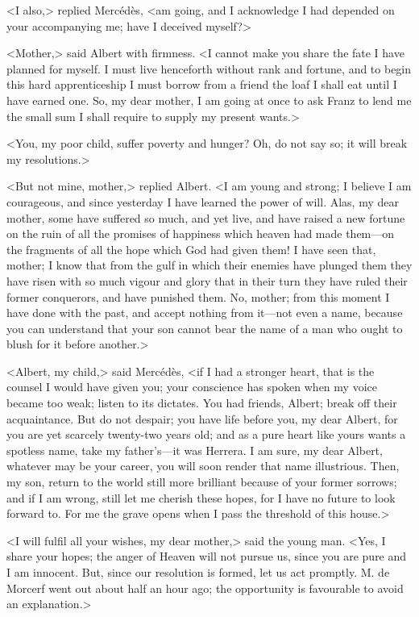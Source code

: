  <I also,> replied Mercédès, <am going, and I acknowledge I had depended on your accompanying me; have I deceived myself?> 

 <Mother,> said Albert with firmness. <I cannot make you share the fate I have planned for myself. I must live henceforth without rank and fortune, and to begin this hard apprenticeship I must borrow from a friend the loaf I shall eat until I have earned one. So, my dear mother, I am going at once to ask Franz to lend me the small sum I shall require to supply my present wants.> 

 <You, my poor child, suffer poverty and hunger? Oh, do not say so; it will break my resolutions.> 

 <But not mine, mother,> replied Albert. <I am young and strong; I believe I am courageous, and since yesterday I have learned the power of will. Alas, my dear mother, some have suffered so much, and yet live, and have raised a new fortune on the ruin of all the promises of happiness which heaven had made them—on the fragments of all the hope which God had given them! I have seen that, mother; I know that from the gulf in which their enemies have plunged them they have risen with so much vigour and glory that in their turn they have ruled their former conquerors, and have punished them. No, mother; from this moment I have done with the past, and accept nothing from it—not even a name, because you can understand that your son cannot bear the name of a man who ought to blush for it before another.> 

 <Albert, my child,> said Mercédès, <if I had a stronger heart, that is the counsel I would have given you; your conscience has spoken when my voice became too weak; listen to its dictates. You had friends, Albert; break off their acquaintance. But do not despair; you have life before you, my dear Albert, for you are yet scarcely twenty-two years old; and as a pure heart like yours wants a spotless name, take my father's—it was Herrera. I am sure, my dear Albert, whatever may be your career, you will soon render that name illustrious. Then, my son, return to the world still more brilliant because of your former sorrows; and if I am wrong, still let me cherish these hopes, for I have no future to look forward to. For me the grave opens when I pass the threshold of this house.> 

 <I will fulfil all your wishes, my dear mother,> said the young man. <Yes, I share your hopes; the anger of Heaven will not pursue us, since you are pure and I am innocent. But, since our resolution is formed, let us act promptly. M. de Morcerf went out about half an hour ago; the opportunity is favourable to avoid an explanation.> 

